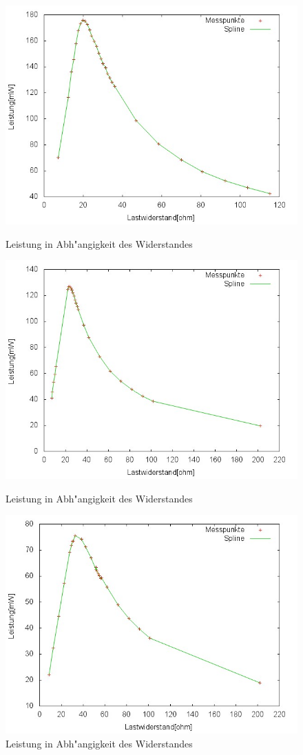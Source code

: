 	\begin{figure}[htbp]
		\centering
		\includegraphics[width = 12cm]{img/290p.jpg}
		\caption{Leistung in Abh"angigkeit des Widerstandes}
		\label{PR1}

		\centering
		\includegraphics[width = 12cm]{img/367p.jpg}
		\caption{Leistung in Abh"angigkeit des Widerstandes}
		\label{PR2}

		\centering
		\includegraphics[width = 12cm]{img/526p.jpg}
		\caption{Leistung in Abh"angigkeit des Widerstandes}
		\label{PR3}


\end{figure}
